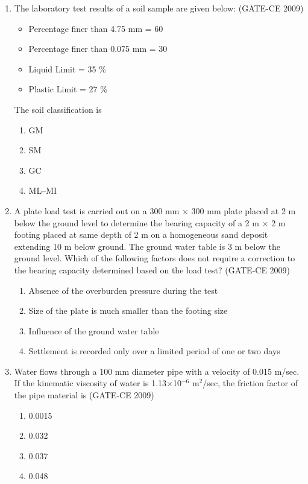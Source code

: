 \documentclass[journal,12pt,onecolumn]{article}
\theoremstyle{remark}
\begin{document}
\begin{enumerate}
    \item The laboratory test results of a soil sample are given below: (GATE-CE 2009)
    \begin{itemize}
        \item Percentage finer than 4.75 mm = 60
        \item Percentage finer than 0.075 mm = 30
        \item Liquid Limit = 35 \%
        \item Plastic Limit = 27 \%
    \end{itemize}
    The soil classification is
    \begin{multicols}{4}
    \begin{enumerate}
        \item GM 
        \item SM 
        \item GC 
        \item ML--MI
    \end{enumerate}
\end{multicols}
    
    \item A plate load test is carried out on a 300 mm $\times$ 300 mm plate placed at 2 m below the ground level to determine the bearing capacity of a 2 m $\times$ 2 m footing placed at same depth of 2 m on a homogeneous sand deposit extending 10 m below ground. The ground water table is 3 m below the ground level. Which of the following factors does not require a correction to the bearing capacity determined based on the load test? (GATE-CE 2009)
    \begin{enumerate}
        \item Absence of the overburden pressure during the test
        \item Size of the plate is much smaller than the footing size
        \item Influence of the ground water table
        \item Settlement is recorded only over a limited period of one or two days
    \end{enumerate}
    
    \item Water flows through a 100 mm diameter pipe with a velocity of 0.015 m/sec. If the kinematic viscosity of water is 1.13$\times$10$^{-6}$ m$^2$/sec, the friction factor of the pipe material is (GATE-CE 2009)
    \begin{multicols}{4}
    \begin{enumerate}
        \item 0.0015 
        \item 0.032 
        \item 0.037 
        \item 0.048
    \end{enumerate}
\end{multicols}
    

\end{enumerate}
\end{document}
